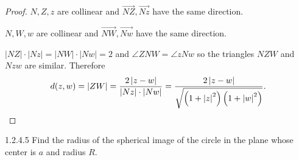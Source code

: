 \begin{proof}
	\( N, Z, z \) are collinear and \( \overrightarrow{NZ}, \overrightarrow{Nz} \) have the same direction.

	\( N, W, w \) are collinear and \( \overrightarrow{NW}, \overrightarrow{Nw} \) have the same direction.

	\( \left\vert NZ \right\vert \cdot \left\vert Nz \right\vert = \left\vert NW \right\vert \cdot \left\vert Nw \right\vert = 2 \) and \( \angle ZNW = \angle zNw \) so the triangles \( NZW \) and \( Nzw \) are similar. Therefore
	\[
		d(z, w) = \left\vert ZW \right\vert = \dfrac{2 \left\vert z - w \right\vert}{\left\vert Nz\right\vert \cdot \left\vert Nw\right\vert} = \dfrac{2 \left\vert z - w \right\vert}{\sqrt{\left( 1 + {\left\vert z \right\vert}^{2} \right)\left( 1 + {\left\vert w \right\vert}^{2} \right)}}.\qedhere
	\]
\end{proof}

\begin{problem}{1.2.4.5}
Find the radius of the spherical image of the circle in the plane whose center is \( a \) and radius \( R \).
\end{problem}


